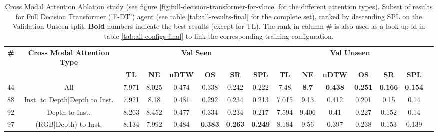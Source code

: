 \begin{table}
\centering
\caption{\label{tab:f_dt_full_dt_ablation}Cross Modal Attention Ablation study (see figure \ref{fig:full-decision-transformer-for-vlnce} for the different attention types). Subset of results for Full Decision Transformer ('F-DT') agent (see table \ref{tab:all-results-final} for the complete set), ranked by descending SPL on the Validation Unseen split. \textbf{Bold} numbers indicate the best results (except for TL). The rank in column \# is also used as a look up id in table \ref{tab:all-configs-final} to link the corresponding training configuration.}
\begin{tabular}{@{\hskip3pt}c@{\hskip3pt}c@{\hskip3pt}c@{\hskip3pt}c@{\hskip3pt}c@{\hskip3pt}c@{\hskip3pt}c@{\hskip3pt}c@{\hskip3pt}c@{\hskip3pt}c@{\hskip3pt}c@{\hskip3pt}c@{\hskip3pt}c@{\hskip3pt}c@{\hskip3pt}c}
\toprule
                                  \textbf{\#} & \textbf{Cross Modal Attention Type} & \multicolumn{6}{c}{\textbf{Val Seen}} & \multicolumn{6}{c}{\textbf{Val Unseen}} \\
\cmidrule(l){3-8}\cmidrule(l){9-14}\textbf{~} &                          \textbf{~} &       \textbf{TL} &    \textbf{NE} &   \textbf{nDTW} &     \textbf{OS} &     \textbf{SR} &    \textbf{SPL} &         \textbf{TL} &   \textbf{NE} &   \textbf{nDTW} &     \textbf{OS} &     \textbf{SR} &    \textbf{SPL} \\
\midrule
                                           44 &                                 All &             7.971 &          8.025 &           0.474 &           0.338 &           0.242 &           0.222 &                7.48 &  \textbf{8.7} &  \textbf{0.438} &  \textbf{0.251} &  \textbf{0.166} &  \textbf{0.154} \\
                                           88 &       Inst. to Depth|Depth to Inst. &             7.921 &           8.18 &           0.481 &           0.292 &           0.234 &           0.213 &               7.015 &          9.13 &           0.412 &           0.201 &            0.15 &            0.14 \\
                                           92 &                      Depth to Inst. &             8.263 &          8.452 &           0.477 &           0.334 &           0.234 &           0.217 &               7.594 &         9.406 &            0.41 &           0.227 &           0.152 &            0.14 \\
                                           97 &                (RGB|Depth) to Inst. &             8.134 &          7.992 &           0.484 &  \textbf{0.383} &  \textbf{0.263} &  \textbf{0.249} &               8.184 &          9.56 &           0.397 &           0.238 &           0.153 &           0.139 \\

\end{tabular}
\end{table}
